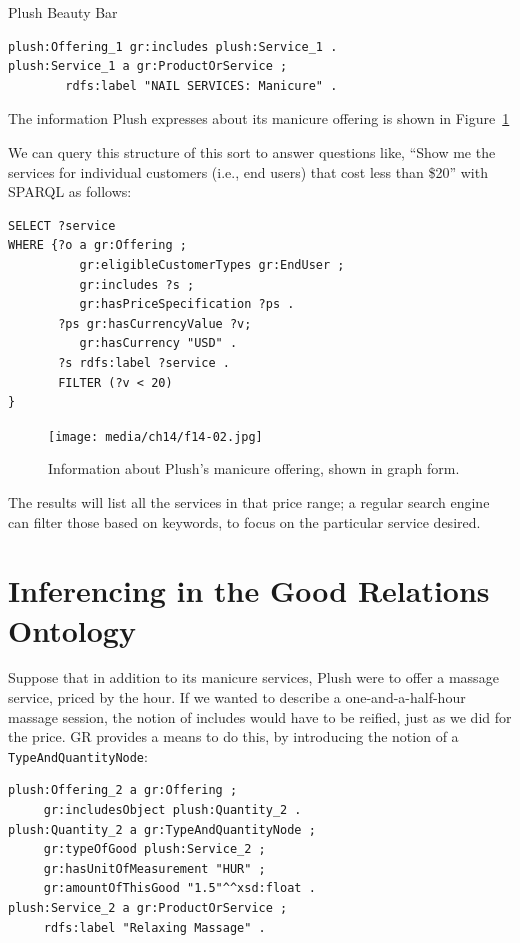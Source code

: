 \begin{example}{Plush Beauty Bar}
\begin{lstlisting}
plush:Offering_1 gr:includes plush:Service_1 .
plush:Service_1 a gr:ProductOrService ; 
        rdfs:label "NAIL SERVICES: Manicure" .
\end{lstlisting}

The information Plush expresses about its manicure offering is shown in
Figure~\ref{fig:ch14.02}

We can query this structure of this sort to answer questions like,
``Show me the services for individual customers (i.e., end users) that
cost less than \$20'' with SPARQL as follows:

\begin{lstlisting}
SELECT ?service
WHERE {?o a gr:Offering ;
          gr:eligibleCustomerTypes gr:EndUser ; 
          gr:includes ?s ;
          gr:hasPriceSpecification ?ps .
       ?ps gr:hasCurrencyValue ?v;
          gr:hasCurrency "USD" .
       ?s rdfs:label ?service .
       FILTER (?v < 20)
}
\end{lstlisting}


\begin{figure}
\centering
\texttt{[image: media/ch14/f14-02.jpg]}
\caption{Information about Plush's manicure offering, shown in graph form.}
\label{fig:ch14.02}
\end{figure}



The results will list all the services in that price range; a regular
search engine can filter those based on keywords, to focus on the
particular service desired.
\end{example}

\section{Inferencing in the Good Relations Ontology}

Suppose that in addition to its manicure services, Plush were to offer a
massage service, priced by the hour. If we wanted to describe a
one-and-a-half-hour massage session, the notion of includes would have
to be reified, just as we did for the price. GR provides a means to do
this, by introducing the notion of a \texttt{TypeAndQuantityNode}:

\begin{lstlisting}
plush:Offering_2 a gr:Offering ; 
     gr:includesObject plush:Quantity_2 .
plush:Quantity_2 a gr:TypeAndQuantityNode ; 
     gr:typeOfGood plush:Service_2 ; 
     gr:hasUnitOfMeasurement "HUR" ; 
     gr:amountOfThisGood "1.5"^^xsd:float .
plush:Service_2 a gr:ProductOrService ;
     rdfs:label "Relaxing Massage" .
\end{lstlisting}

